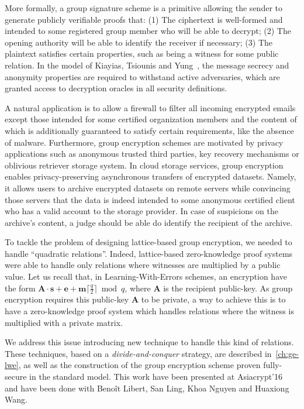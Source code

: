 More formally, a group signature scheme is a primitive allowing the sender to generate publicly verifiable proofs that: (1) The ciphertext is well-formed and intended to some registered group member who will be able to decrypt; (2) The opening authority will be able to identify the receiver if necessary; (3) The plaintext satisfies certain properties, such as being a witness for some public relation.
In the model of Kiayias, Tsiounis and Yung~\cite{KTY07}, the message secrecy and anonymity properties are required to withstand active adversaries, which are granted access to decryption oracles in all security definitions.

A natural application is to allow a firewall to filter all incoming encrypted emails except those intended for some certified organization members and the content of which is additionally guaranteed to satisfy certain requirements, like the absence of malware.
Furthermore, group encryption schemes are motivated by privacy applications such as anonymous trusted third parties, key recovery mechanisms or oblivious retriever storage system.
In cloud storage services, group encryption enables privacy-preserving asynchronous transfers of encrypted datasets.
Namely, it allows users to archive encrypted datasets on remote servers while convincing those servers that the data is indeed intended to some anonymous certified client who has a valid account to the storage provider.
In case of suspicions on the archive's content, a judge should be able do identify the recipient of the archive.

To tackle the problem of designing lattice-based group encryption, we needed to handle ``quadratic relations''.
Indeed, lattice-based zero-knowledge proof systems were able to handle only relations where witnesses are multiplied by a public value.
Let us recall that, in Learning-With-Errors schemes, an encryption have the form $\mathbf{A} \cdot \mathbf{s} + \mathbf{e} + \mathbf{m} \lceil \frac{q}{2} \rceil \bmod q$, where $\mathbf{A}$ is the recipient public-key.
As group encryption requires this public-key $\mathbf{A}$ to be private, a way to achieve this is to have a zero-knowledge proof system which handles relations where the witness is multiplied with a private matrix.

We address this issue introducing new technique to handle this kind of relations.
These techniques, based on a \textit{divide-and-conquer} strategy, are described in~\cref{ch:ge-lwe}, as well as the construction of the group encryption scheme proven fully-secure in the standard model.
This work have been presented at Asiacrypt'16~\cite{LLM+16a} and have been done with Benoît Libert, San Ling, Khoa Nguyen and Huaxiong Wang.

